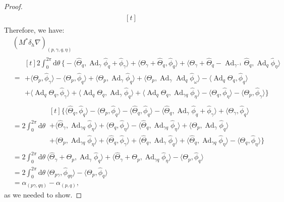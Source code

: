 \documentclass[12pt]{amsart}
\DeclareMathOperator{\Ad}{Ad}
\theoremstyle{plain}
\theoremstyle{definition}
\theoremstyle{remark}
\numberwithin{equation}{section}
\newcommand{\<}{\langle}
\renewcommand{\>}{\rangle}
\newcommand{\intSone}{\int_{0}^{2\pi}\mathrm{d}\theta\,}
\newcommand{\Thetahat}{\widehat{\Theta}}
\newcommand{\phihat}{\widehat{\phi}}
\begin{document}
\begin{proof}
\begin{align*}
\begin{multlined}[t]
    \end{multlined}
\end{align*}
Therefore, we have:
\begin{align*}
  &(M^*\delta_h \nabla)_{(p,\gamma,q,\eta)} \\
  & =  \begin{multlined}[t]
       2\intSone \Big\{
        -\langle\Thetahat_q,\Ad_\gamma \phihat_q + \phihat_\gamma\rangle + \langle\Theta_\gamma + \Thetahat_q,\phihat_q\rangle
        + \langle\Theta_\gamma + \Thetahat_q - \Ad_{\gamma^{-1}}\Thetahat_q,\Ad_q \phihat_\eta  \rangle
        \\
        + \langle\Theta_p, \phihat_\gamma\rangle - \langle\Theta_p, \phihat_q\rangle + \langle\Theta_p,\Ad_\gamma \phihat_q\rangle + \langle\Theta_p, \Ad_\gamma\Ad_q \phihat_\omega\rangle -\langle\Ad_q \Theta_q, \phihat_q \rangle\\
        + \langle\Ad_q \Theta_q, \phihat_\gamma\rangle + \langle\Ad_q\Theta_q ,\Ad_\gamma\phihat_q\rangle + \langle\Ad_q\Theta_q,\Ad_{\gamma q}\phihat_\eta\rangle
        -\langle\Theta_q,\phihat_\eta\rangle  - \langle\Theta_p, \phihat_\gamma\rangle
      \Big\}
    \end{multlined}\\
  & = 2\intSone \begin{multlined}[t]
       \Big\{
         \langle\Thetahat_q ,\phihat_q \rangle
        - \langle \Theta_p ,\phihat_q \rangle
        - \langle\Thetahat_q  ,\phihat_q \rangle
        -  \langle\Thetahat_q,\Ad_\gamma \phihat_q + \phihat_\gamma\rangle
        + \langle\Theta_\gamma,\phihat_q \rangle\\
        + \langle\Thetahat_\gamma,\Ad_{\gamma q} \phihat_\eta \rangle
        + \langle \Theta_q ,\phihat_\eta \rangle
        - \langle\Thetahat_q ,\Ad_{\gamma q}\phihat_\eta \rangle
        + \langle\Theta_p ,\Ad_\gamma\phihat_q \rangle\\
        + \langle\Theta_p ,\Ad_{\gamma q}\phihat_\eta \rangle
        + \langle\Thetahat_q,\phihat_\gamma \rangle
        + \langle\Thetahat_q,\Ad_\gamma\phihat_q \rangle
        + \langle\Thetahat_q ,\Ad_{\gamma q}\phihat_\eta \rangle
        - \langle\Theta_q ,\phihat_\eta \rangle
      \Big\}
    \end{multlined}\\
  & = 2\intSone  
        \langle\Thetahat_\gamma 
          + \Theta_p ,\Ad_\gamma \phihat_q\rangle
        + \langle\Thetahat_\gamma + \Theta_p , \Ad_{\gamma q}\phihat_\eta \rangle -\langle\Theta_p ,\phihat_q \rangle
    \\
  & = 2\intSone \langle\Theta_{p\gamma} ,\phihat_{q\eta}\rangle  -\langle \Theta_p ,\phihat_q\rangle
  \\
    & = \alpha_{(p\gamma,q\eta)} - \alpha_{(p,q)},
\end{align*}
as we needed to show.
\end{proof}
\end{document}
